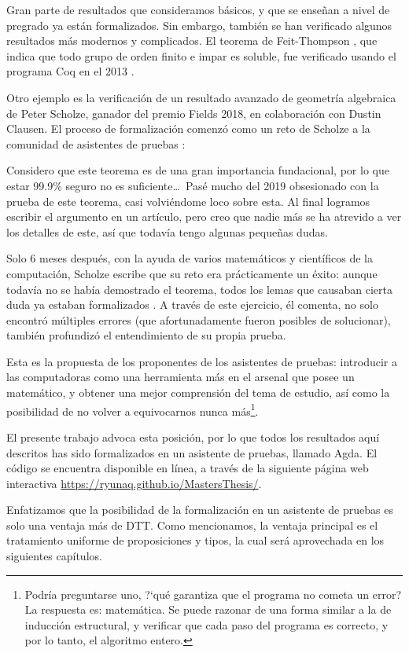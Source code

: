 \documentclass[../main.tex]{subfiles}
\begin{document}
Gran parte de resultados que consideramos b\'asicos, y que se ense\~nan a nivel de pregrado ya est\'an formalizados.
Sin embargo, tambi\'en se han verificado algunos resultados m\'as modernos y complicados.
El teorema de Feit-Thompson \cite{1103053943}, que indica que todo grupo de orden finito e impar es soluble, fue verificado usando el programa Coq en el 2013 \cite{ftcoq2013}.

Otro ejemplo es la verificaci\'on de un resultado avanzado de geometr\'ia algebraica de Peter Scholze, ganador del premio Fields 2018, en colaboraci\'on con Dustin Clausen.
El proceso de formalizaci\'on comenz\'o como un reto de Scholze a la comunidad de asistentes de pruebas \cite{scholze_2020}:
\begin{displayquote}
    Considero que este teorema es de una gran importancia fundacional, por lo que estar 99.9\% seguro no es suficiente\ldots\
    Pas\'e mucho del 2019 obsesionado con la prueba de este teorema, casi volvi\'endome loco sobre esta. Al final logramos escribir el argumento en un art\'iculo, pero creo que nadie m\'as se ha atrevido a ver los detalles de este, as\'i que todav\'ia tengo algunas peque\~nas dudas.
\end{displayquote}

Solo 6 meses despu\'es, con la ayuda de varios matem\'aticos y cient\'ificos de la computaci\'on, Scholze escribe que su reto era pr\'acticamente un \'exito: aunque todav\'ia no se hab\'ia demostrado el teorema, todos los lemas que causaban cierta duda ya estaban formalizados \cite{scholze_half_2021}.
A trav\'es de este ejercicio, \'el comenta, no solo encontr\'o m\'ultiples errores (que afortunadamente fueron posibles de solucionar), tambi\'en profundiz\'o el entendimiento de su propia prueba.

Esta es la propuesta de los proponentes de los asistentes de pruebas: introducir a las computadoras como una herramienta m\'as en el arsenal que posee un matem\'atico, y obtener una mejor comprensi\'on del tema de estudio, as\'i como la posibilidad de no volver a equivocarnos nunca m\'as\footnote{Podr\'ia preguntarse uno, ?`qu\'e garantiza que el programa no cometa un error? La respuesta es: matemática. Se puede razonar de una forma similar a la de inducción estructural, y verificar que cada paso del programa es correcto, y por lo tanto, el algoritmo entero.}.

El presente trabajo advoca esta posici\'on, por lo que todos los resultados aqu\'i descritos has sido formalizados en un asistente de pruebas, llamado Agda.
El c\'odigo se encuentra disponible en l\'inea, a trav\'es de la siguiente p\'agina web interactiva \url{https://ryunaq.github.io/MastersThesis/}.

Enfatizamos que la posibilidad de la formalizaci\'on en un asistente de pruebas es solo una ventaja m\'as de DTT.
Como mencionamos, la ventaja principal es el tratamiento uniforme de proposiciones y tipos, la cual ser\'a aprovechada en los siguientes cap\'itulos.
\end{document}
